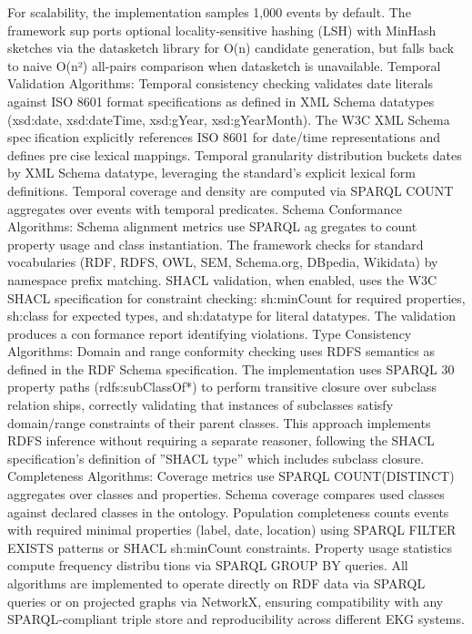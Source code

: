 For scalability, the implementation samples 1,000 events by default. The framework supports optional locality-sensitive hashing (LSH) with MinHash sketches via the datasketch
library for O(n) candidate generation, but falls back to naive O(n²) all-pairs comparison
when datasketch is unavailable.
Temporal Validation Algorithms: Temporal consistency checking validates date
literals against ISO 8601 format specifications as defined in XML Schema datatypes
(xsd:date, xsd:dateTime, xsd:gYear, xsd:gYearMonth). The W3C XML Schema specification explicitly references ISO 8601 for date/time representations and defines precise lexical mappings. Temporal granularity distribution buckets dates by XML Schema
datatype, leveraging the standard’s explicit lexical form definitions. Temporal coverage
and density are computed via SPARQL COUNT aggregates over events with temporal
predicates.
Schema Conformance Algorithms: Schema alignment metrics use SPARQL aggregates to count property usage and class instantiation. The framework checks for
standard vocabularies (RDF, RDFS, OWL, SEM, Schema.org, DBpedia, Wikidata) by
namespace prefix matching. SHACL validation, when enabled, uses the W3C SHACL
specification for constraint checking: sh:minCount for required properties, sh:class for
expected types, and sh:datatype for literal datatypes. The validation produces a conformance report identifying violations.
Type Consistency Algorithms: Domain and range conformity checking uses RDFS
semantics as defined in the RDF Schema specification. The implementation uses SPARQL
30
property paths (rdfs:subClassOf*) to perform transitive closure over subclass relationships, correctly validating that instances of subclasses satisfy domain/range constraints
of their parent classes. This approach implements RDFS inference without requiring a
separate reasoner, following the SHACL specification’s definition of ”SHACL type” which
includes subclass closure.
Completeness Algorithms: Coverage metrics use SPARQL COUNT(DISTINCT)
aggregates over classes and properties. Schema coverage compares used classes against
declared classes in the ontology. Population completeness counts events with required
minimal properties (label, date, location) using SPARQL FILTER EXISTS patterns or
SHACL sh:minCount constraints. Property usage statistics compute frequency distributions via SPARQL GROUP BY queries.
All algorithms are implemented to operate directly on RDF data via SPARQL queries
or on projected graphs via NetworkX, ensuring compatibility with any SPARQL-compliant
triple store and reproducibility across different EKG systems.
